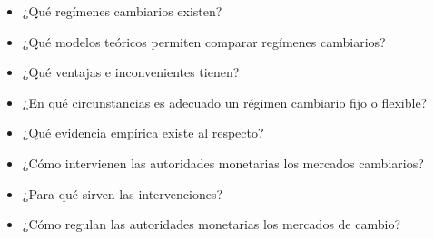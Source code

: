\documentclass{nuevotema}
\begin{document}
\ideaclave


\begin{itemize}
	\item ¿Qué regímenes cambiarios existen?
	\item ¿Qué modelos teóricos permiten comparar regímenes cambiarios?
	\item ¿Qué ventajas e inconvenientes tienen?
	\item ¿En qué circunstancias es adecuado un régimen cambiario fijo o flexible?
	\item ¿Qué evidencia empírica existe al respecto?
	\item ¿Cómo intervienen las autoridades monetarias los mercados cambiarios?
	\item ¿Para qué sirven las intervenciones?
	\item ¿Cómo regulan las autoridades monetarias los mercados de cambio?
\end{itemize}

\esquemacorto
\end{document}
